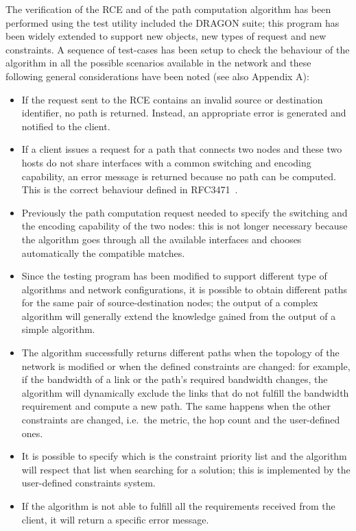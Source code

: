 \documentclass[10pt,a4paper]{report}
\begin{document}
The verification of the RCE and of the path computation algorithm has
been performed using the test utility included the DRAGON suite; this
program has been widely extended to support new objects, new types of
request and new constraints. A sequence of test-cases has been setup
to check the behaviour of the algorithm in all the possible scenarios
available in the network and these following general considerations
have been noted (see also Appendix A):
\begin{itemize}
\item If the request sent to the RCE contains an invalid source or
  destination identifier, no path is returned. Instead, an appropriate
  error is generated and notified to the client.
\item If a client issues a request for a path that connects two nodes
  and these two hosts do not share interfaces with a common switching
  and encoding capability, an error message is returned because no
  path can be computed. This is the correct behaviour defined in
  RFC3471~\cite{rfc3471}.
\item Previously the path computation request needed to specify the
  switching and the encoding capability of the two nodes: this is not
  longer necessary because the algorithm goes through all the
  available interfaces and chooses automatically the compatible
  matches.
\item Since the testing program has been modified to support different
  type of algorithms and network configurations, it is possible to
  obtain different paths for the same pair of source-destination
  nodes; the output of a complex algorithm will generally extend the
  knowledge gained from the output of a simple algorithm.
\item The algorithm successfully returns different paths when the
  topology of the network is modified or when the defined constraints
  are changed: for example, if the bandwidth of a link or the path's
  required bandwidth changes, the algorithm will dynamically exclude
  the links that do not fulfill the bandwidth requirement and compute
  a new path. The same happens when the other constraints are changed,
  i.e.\ the metric, the hop count and the user-defined ones.
\item It is possible to specify which is the constraint priority list and
  the algorithm will respect that list when searching for a solution;
  this is implemented by the user-defined constraints system.
\item If the algorithm is not able to fulfill all the requirements
  received from the client, it will return a specific error message.
\end{itemize}
\end{document}
